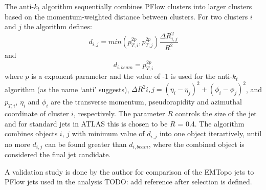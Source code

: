 The anti-$k_t$ algorithm 
sequentially combines PFlow clusters into larger clusters based on the 
momentum-weighted distance between clusters. 
For two clusters $i$ and $j$ the algorithm defines:
\[  d_{i,j} = min(p_{T,i}^{2p},p_{T,j}^{2p}) \frac{\Delta R_{i,j}^2}{R^2} \]
and 
\[ d_{i,beam} = p_{T,i}^{2p} \]
where $p$ is a exponent parameter and the value of -1 is used
for the anti-$k_t$ algorithm (as the name `anti' suggests),
$\Delta R^2{i,j} = (\eta_i - \eta_j)^2 + (\phi_i - \phi_j)^2 $, 
and $p_{T,i}$, $\eta_i$ and $\phi_i$ are 
the transverse momentum, 
pseudorapidity and azimuthal coordinate
of cluster $i$, respectively. 
The parameter $R$ controls the size of the jet and for standard jets 
in ATLAS this is chosen to be $R$ = 0.4.
The algorithm combines objects $i$, $j$ with minimum value of $d_{i,j}$
into one object iterartively, until no more $d_{i,j}$ can be found greater
than $d_{i,beam}$, where the combined object is considered the final jet 
candidate.

A validation study is done by the author for comparison of the EMTopo jets 
to PFlow jets used in the analysis TODO: add reference after selection is defined.

